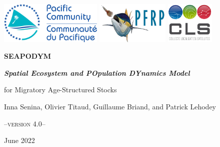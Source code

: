 \documentclass[a4paper,12pt,twoside]{book}
\begin{document}
\begin{titlepage}
\centering

\includegraphics[height=2cm]{intro/figs/SPC-CPS-logo_27_stars} \hspace{1.5cm}
\includegraphics[height=2cm]{intro/figs/logo-PFRP-large} \hspace{1.5cm}
\includegraphics[height=2cm]{intro/figs/logo-CLS}
\noindent{\color{gray}\rule{16cm}{0.4pt}}

\vspace{4cm}

{\fontsize{36pt}{42pt} \bfseries \color{teal} SEAPODYM \par}

\vspace{3.5cm}


{\Large \slshape \bfseries{Spatial Ecosystem and POpulation DYnamics Model} \\ \Large\slshape{for Migratory Age-Structured Stocks \par}}

\vspace{1.5cm}
{\large Inna Senina, Olivier Titaud, Guillaume Briand, and Patrick Lehodey \par}

\vspace{3cm}
{\Large \scshape --version 4.0-- \par}

\vspace{5cm}

\noindent{\color{gray}\rule{5cm}{0.4pt}}

{\large June 2022 \par}


\vfill

\end{titlepage}
\restoregeometry
\end{document}
